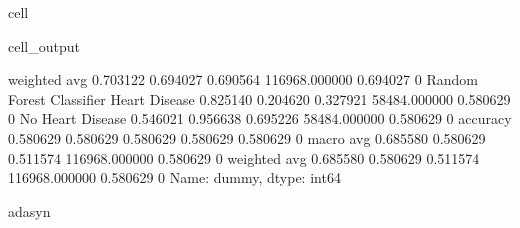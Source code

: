 \documentclass[letterpaper,10pt,english]{jupyterBook}
\begin{document}
\begin{sphinxuseclass}{cell}
\begin{sphinxVerbatimOutput}
\begin{sphinxuseclass}{cell_output}
\begin{sphinxVerbatim}[commandchars=\\\{\}]
                           weighted avg      0.703122   0.694027  0.690564  116968.000000  0.694027    0
Random Forest Classifier   Heart Disease     0.825140   0.204620  0.327921  58484.000000   0.580629    0
                           No Heart Disease  0.546021   0.956638  0.695226  58484.000000   0.580629    0
                           accuracy          0.580629   0.580629  0.580629  0.580629       0.580629    0
                           macro avg         0.685580   0.580629  0.511574  116968.000000  0.580629    0
                           weighted avg      0.685580   0.580629  0.511574  116968.000000  0.580629    0
Name: dummy, dtype: int64

adasyn
\PYGZhy{}\PYGZhy{}\PYGZhy{}\PYGZhy{}\PYGZhy{}\PYGZhy{}\PYGZhy{}\PYGZhy{}\PYGZhy{}\PYGZhy{}\PYGZhy{}\PYGZhy{}\PYGZhy{}\PYGZhy{}\PYGZhy{}\PYGZhy{}\PYGZhy{}\PYGZhy{}\PYGZhy{}
\end{sphinxVerbatim}

\noindent{}


\end{sphinxuseclass}
\end{sphinxVerbatimOutput}
\end{sphinxuseclass}
\end{document}
